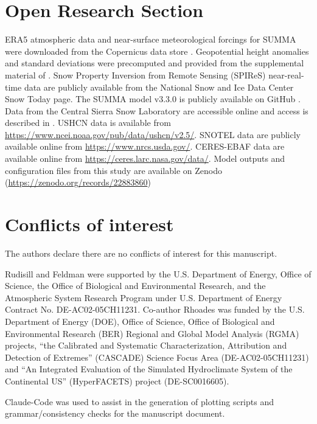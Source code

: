 \documentclass[draft]{agujournal2019}
\begin{document}
\section*{Open Research Section}
ERA5 atmospheric data and near-surface meteorological forcings for SUMMA were downloaded from the Copernicus data store .
Geopotential height anomalies and standard deviations were precomputed and provided from the supplemental material of .
Snow Property Inversion from Remote Sensing (SPIReS) near-real-time data are publicly available from the National Snow and Ice Data Center Snow Today page.
The SUMMA model v3.3.0 is publicly available on GitHub \cite{clark_2024_13117685}.
Data from the Central Sierra Snow Laboratory are accessible online and access is described in .
USHCN data is available from \url{https://www.ncei.noaa.gov/pub/data/ushcn/v2.5/}. 
SNOTEL data are publicly available online from \url{https://www.nrcs.usda.gov/}.
CERES-EBAF data are available online from \url{https://ceres.larc.nasa.gov/data/}.
Model outputs and configuration files from this study are available on Zenodo (\url{https://zenodo.org/records/22883860})

\section*{Conflicts of interest}
The authors declare there are no conflicts of interest for this manuscript.


\acknowledgments
Rudisill and Feldman were supported by the U.S. Department of Energy, Office of Science, the Office of Biological and
Environmental Research, and the Atmospheric System Research Program under U.S. Department of Energy Contract No.
DE-AC02-05CH11231.
Co-author Rhoades was funded by the U.S. Department of Energy (DOE), Office of Science, Office of Biological and Environmental Research (BER) Regional and Global Model Analysis (RGMA) projects, “the Calibrated and Systematic  Characterization, Attribution and Detection of Extremes” (CASCADE) Science Focus Area (DE-AC02-05CH11231) and “An Integrated Evaluation of the Simulated Hydroclimate System of the Continental US” (HyperFACETS) project (DE-SC0016605).

Claude-Code was used to assist in the generation of plotting scripts and grammar/consistency checks for the manuscript document.



\appendix
\end{document}
